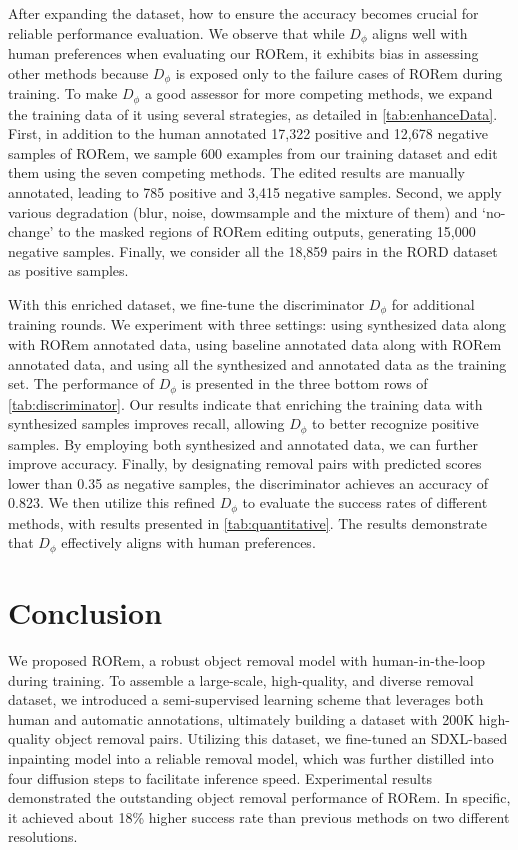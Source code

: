 \documentclass[10pt,twocolumn,letterpaper]{article}
\begin{document}
After expanding the dataset, how to ensure the accuracy becomes crucial for reliable performance evaluation. We observe that while $ D_{\phi} $ aligns well with human preferences when evaluating our RORem, it exhibits bias in assessing other methods because $ D_{\phi} $ is exposed only to the failure cases of RORem during training. To make $ D_{\phi} $ a good assessor for more competing methods, we expand the training data of it using several strategies, as detailed in \cref{tab:enhanceData}.
First, in addition to the human annotated 17,322 positive and 12,678 negative samples of RORem, we sample 600 examples from our training dataset and edit them using the seven competing methods. The edited results are manually annotated, leading to 785 positive and 3,415 negative samples. Second, we apply various degradation (blur, noise, dowmsample and the mixture of them) and `no-change' to the masked regions of RORem editing outputs, generating 15,000 negative samples. Finally, we consider all the 18,859 pairs in the RORD dataset as positive samples.

With this enriched dataset, we fine-tune the discriminator $ D_{\phi} $ for additional training rounds. We experiment with three settings: using synthesized data along with RORem annotated data, using baseline annotated data along with RORem annotated data, and using all the synthesized and annotated data as the training set. The performance of $ D_{\phi} $ is presented in the three bottom rows of \cref{tab:discriminator}.
Our results indicate that enriching the training data with synthesized samples improves recall, allowing $ D_{\phi} $ to better recognize positive samples. 
By employing both synthesized and annotated data, we can further improve accuracy. Finally, by designating removal pairs with predicted scores lower than 0.35 as negative samples, the discriminator achieves an accuracy of 0.823.
We then utilize this refined $ D_{\phi} $ to evaluate the success rates of different methods, with results presented in \cref{tab:quantitative}. The results demonstrate that $ D_{\phi} $ effectively aligns with human preferences.


\section{Conclusion}
\label{sec:conclusion}
We proposed RORem, a robust object removal model with human-in-the-loop during training. To assemble a large-scale, high-quality, and diverse removal dataset, we introduced a semi-supervised learning scheme that leverages both human and automatic annotations, ultimately building a dataset with 200K high-quality object removal pairs. Utilizing this dataset, we fine-tuned an SDXL-based inpainting model into a reliable removal model, which was further distilled into four diffusion steps to  facilitate inference speed. Experimental results demonstrated the outstanding object removal performance of RORem. In specific, it achieved about 18\% higher success rate than previous methods on two different resolutions.
\end{document}
